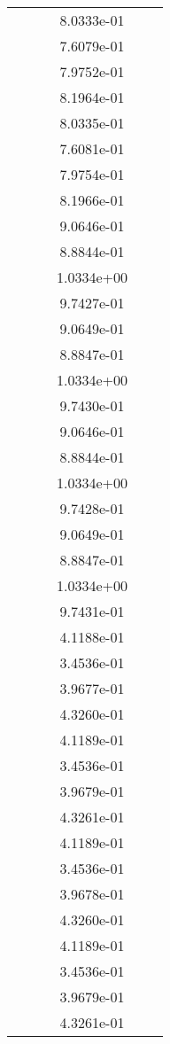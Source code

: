 \begin{xltabular}{\textwidth}{r|rS[table-format=1.3e+2]S[table-format=1.4e+2]S[table-format=1.4e+2]S[table-format=-1.5]}
&  &  & 8.0333e-01 & & \\
&  &  & 7.6079e-01 & & \\
&  &  & 7.9752e-01 & & \\
&  &  & 8.1964e-01 & & \\
&  &  & 8.0335e-01 & & \\
&  &  & 7.6081e-01 & & \\
&  &  & 7.9754e-01 & & \\
&  &  & 8.1966e-01 & & \\
&  &  & 9.0646e-01 & & \\
&  &  & 8.8844e-01 & & \\
&  &  & 1.0334e+00 & & \\
&  &  & 9.7427e-01 & & \\
&  &  & 9.0649e-01 & & \\
&  &  & 8.8847e-01 & & \\
&  &  & 1.0334e+00 & & \\
&  &  & 9.7430e-01 & & \\
&  &  & 9.0646e-01 & & \\
&  &  & 8.8844e-01 & & \\
&  &  & 1.0334e+00 & & \\
&  &  & 9.7428e-01 & & \\
&  &  & 9.0649e-01 & & \\
&  &  & 8.8847e-01 & & \\
&  &  & 1.0334e+00 & & \\
&  &  & 9.7431e-01 & & \\
&  &  & 4.1188e-01 & & \\
&  &  & 3.4536e-01 & & \\
&  &  & 3.9677e-01 & & \\
&  &  & 4.3260e-01 & & \\
&  &  & 4.1189e-01 & & \\
&  &  & 3.4536e-01 & & \\
&  &  & 3.9679e-01 & & \\
&  &  & 4.3261e-01 & & \\
&  &  & 4.1189e-01 & & \\
&  &  & 3.4536e-01 & & \\
&  &  & 3.9678e-01 & & \\
&  &  & 4.3260e-01 & & \\
&  &  & 4.1189e-01 & & \\
&  &  & 3.4536e-01 & & \\
&  &  & 3.9679e-01 & & \\
&  &  & 4.3261e-01 & & \\

\end{xltabular}
